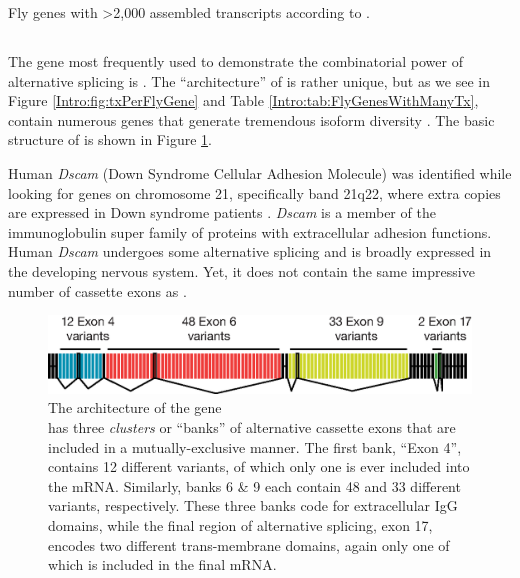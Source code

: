     \begin{table} %
      \caption{Fly genes with >2,000 assembled transcripts according to \citep{Brown2014}.}
      \label{Intro:tab:FlyGenesWithManyTx}
      
      \end{table}

  \subsection{\flies{} \dscam{}}
    \label{Intro:subsec:Dscam}

    The gene most frequently used to demonstrate the combinatorial power of alternative splicing is \flies{} \dscam{}. The ``architecture'' of \dscam{} is rather unique, but as we see in Figure \ref{Intro:fig:txPerFlyGene} and Table \ref{Intro:tab:FlyGenesWithManyTx}, \flies{} contain numerous genes that generate tremendous isoform diversity \citep{Brown2014}. The basic structure of \dscam{} is shown in Figure \ref{Intro:fig:DscamArch}.

    Human \textit{Dscam} (Down Syndrome Cellular Adhesion Molecule) was identified while looking for genes on chromosome 21, specifically band 21q22, where extra copies are expressed in Down syndrome patients \citep{Yamakawa1998a}. \textit{Dscam} is a member of the immunoglobulin super family of proteins with extracellular adhesion functions. Human \textit{Dscam} undergoes some alternative splicing and is broadly expressed in the developing nervous system. Yet, it does not contain the same impressive number of cassette exons as \flies{} \dscam{}.

    \begin{figure} %
      \centering 
      \includegraphics{Figures/Intro/DscamArch.eps}
      \caption[The architecture of the \flies{} gene \dscam{}]
      {
        The architecture of the \flies{} gene \dscam{}\\[0.25cm]
        \dscam{} has three \textit{clusters} or ``banks'' of alternative cassette exons that are included in a mutually-exclusive manner. The first bank, ``Exon 4'', contains 12 different variants, of which only one is ever included into the mRNA. Similarly, banks 6 \& 9 each contain 48 and 33 different variants, respectively. These three banks code for extracellular IgG domains, while the final region of alternative splicing, exon 17, encodes two different trans-membrane domains, again only one of which is included in the final mRNA.
          }
        \label{Intro:fig:DscamArch}
        \end{figure}

